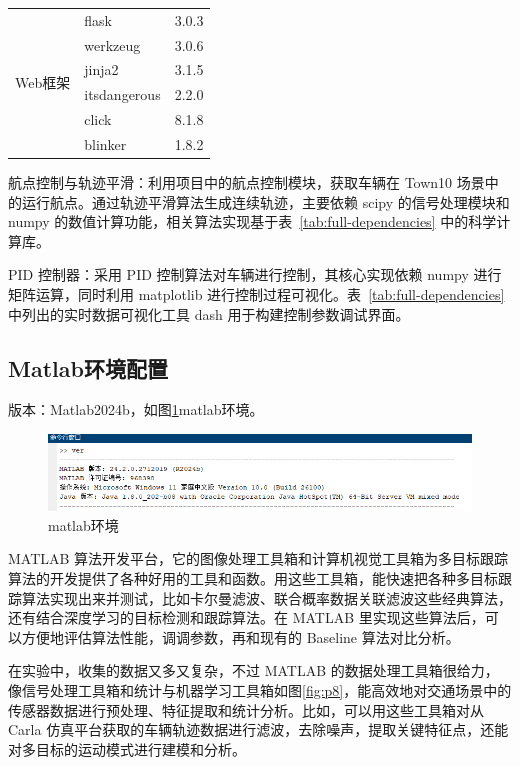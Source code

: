 \begin{table}[htbp]
\begin{tabular}{lll}
		\hline
		\multirow{6}{*}{Web框架}
		& flask & 3.0.3 \\
		& werkzeug & 3.0.6 \\
		& jinja2 & 3.1.5 \\
		& itsdangerous & 2.2.0 \\
		& click & 8.1.8 \\
		& blinker & 1.8.2 \\
		
		
		
		\hline
	\end{tabular}
\end{table}

航点控制与轨迹平滑：利用项目中的航点控制模块，获取车辆在 Town10 场景中的运行航点。通过轨迹平滑算法生成连续轨迹，主要依赖 scipy 的信号处理模块和 numpy 的数值计算功能，相关算法实现基于表~\ref{tab:full-dependencies} 中的科学计算库。

PID 控制器：采用 PID 控制算法对车辆进行控制，其核心实现依赖 numpy 进行矩阵运算，同时利用 matplotlib 进行控制过程可视化。表~\ref{tab:full-dependencies} 中列出的实时数据可视化工具 dash 用于构建控制参数调试界面。

\subsection{Matlab环境配置}

版本：Matlab2024b，如图\ref{fig:p7}matlab环境。


\begin{figure}[htbp] %
	\centering
	\includegraphics[width=1\textwidth]{p7} %
	\caption{matlab环境} %
	\label{fig:p7} %
\end{figure}


MATLAB 算法开发平台，它的图像处理工具箱和计算机视觉工具箱为多目标跟踪算法的开发提供了各种好用的工具和函数。用这些工具箱，能快速把各种多目标跟踪算法实现出来并测试，比如卡尔曼滤波、联合概率数据关联滤波这些经典算法，还有结合深度学习的目标检测和跟踪算法。在 MATLAB 里实现这些算法后，可以方便地评估算法性能，调调参数，再和现有的 Baseline 算法对比分析。

在实验中，收集的数据又多又复杂，不过 MATLAB 的数据处理工具箱很给力，像信号处理工具箱和统计与机器学习工具箱如图\ref{fig:p8}，能高效地对交通场景中的传感器数据进行预处理、特征提取和统计分析。比如，可以用这些工具箱对从 Carla 仿真平台获取的车辆轨迹数据进行滤波，去除噪声，提取关键特征点，还能对多目标的运动模式进行建模和分析。




